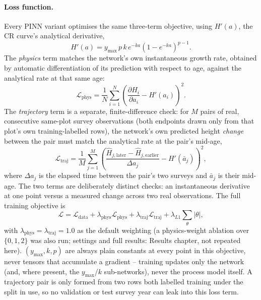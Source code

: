 \paragraph{Loss function.} Every PINN variant optimises the same three-term objective, using
$H'(a)$, the CR curve's analytical derivative,
\begin{equation}
H'(a) = y_{\max}\,p\,k\,e^{-ka}\left(1-e^{-ka}\right)^{p-1}.
\label{eq:cr-derivative}
\end{equation}
The \emph{physics} term matches the network's own instantaneous growth rate, obtained by automatic
differentiation of its prediction with respect to age, against the analytical rate at that same
age:
\begin{equation}
\mathcal{L}_{\text{phys}} = \frac{1}{N}\sum_{i=1}^{N}\left(\frac{\partial \hat H_i}{\partial a_i} -
H'(a_i)\right)^2.
\label{eq:physics-loss}
\end{equation}
The \emph{trajectory} term is a separate, finite-difference check: for $M$ pairs of real,
consecutive same-plot survey observations (both endpoints drawn only from that plot's own
training-labelled rows), the network's own predicted height \emph{change} between the pair must
match the analytical rate at the pair's mid-age,
\begin{equation}
\mathcal{L}_{\text{traj}} = \frac{1}{M}\sum_{j=1}^{M}\left(\frac{\hat H_{j,\text{later}} -
\hat H_{j,\text{earlier}}}{\Delta a_j} - H'(\bar a_j)\right)^2,
\label{eq:trajectory-loss}
\end{equation}
where $\Delta a_j$ is the elapsed time between the pair's two surveys and $\bar a_j$ is their
mid-age. The two terms are deliberately distinct checks: an instantaneous derivative at one point
versus a measured change across two real observations. The full training objective is
\begin{equation}
\mathcal{L} = \mathcal{L}_{\text{data}} + \lambda_{\text{phys}}\mathcal{L}_{\text{phys}} +
\lambda_{\text{traj}}\mathcal{L}_{\text{traj}} + \lambda_{L1}\sum_{\theta}|\theta|,
\label{eq:total-loss}
\end{equation}
with $\lambda_{\text{phys}}=\lambda_{\text{traj}}=1.0$ as the default weighting (a physics-weight
ablation over $\{0,1,2\}$ was also run; settings and full results: Results chapter, not repeated
here). $(y_{\max},k,p)$ are always plain constants at every point in this objective, never
tensors that accumulate a gradient -- training updates only the network (and, where present, the
$y_{\max}$/$k$ sub-networks), never the process model itself. A trajectory pair is only formed
from two rows both labelled training under the split in use, so no validation or test survey year
can leak into this loss term.

